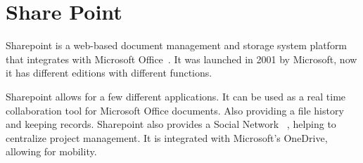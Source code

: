 \section{Share Point}

Sharepoint is a web-based document management and storage system platform that 
integrates with Microsoft Office~\cite{www-hid-sp18-601-spoint-website}. It was
 launched in 2001 by Microsoft, now it 
has different editions with different functions.

Sharepoint allows for a few different applications. It can be used as a real 
time collaboration tool for Microsoft Office documents. Also providing a 
file history and keeping records. Sharepoint also provides a Social Network 
~\cite{www-hid-sp18-601-spoint-new-sharepoint}, 
helping to centralize project management. It is integrated with Microsoft's 
OneDrive, allowing for mobility.
